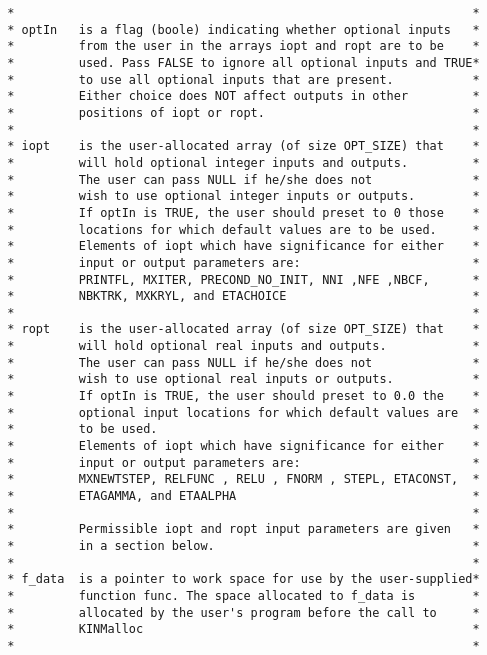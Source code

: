 \documentclass[11pt]{article}
\begin{document}
\begin{verbatim}
 *                                                                *
 * optIn   is a flag (boole) indicating whether optional inputs   *
 *         from the user in the arrays iopt and ropt are to be    *
 *         used. Pass FALSE to ignore all optional inputs and TRUE*
 *         to use all optional inputs that are present.           *
 *         Either choice does NOT affect outputs in other         *
 *         positions of iopt or ropt.                             *
 *                                                                *
 * iopt    is the user-allocated array (of size OPT_SIZE) that    *
 *         will hold optional integer inputs and outputs.         *
 *         The user can pass NULL if he/she does not              *
 *         wish to use optional integer inputs or outputs.        *
 *         If optIn is TRUE, the user should preset to 0 those    *
 *         locations for which default values are to be used.     *
 *         Elements of iopt which have significance for either    *
 *         input or output parameters are:                        *
 *         PRINTFL, MXITER, PRECOND_NO_INIT, NNI ,NFE ,NBCF,      *
 *         NBKTRK, MXKRYL, and ETACHOICE                          *
 *                                                                *
 * ropt    is the user-allocated array (of size OPT_SIZE) that    *
 *         will hold optional real inputs and outputs.            *
 *         The user can pass NULL if he/she does not              *
 *         wish to use optional real inputs or outputs.           *
 *         If optIn is TRUE, the user should preset to 0.0 the    *
 *         optional input locations for which default values are  *
 *         to be used.                                            *
 *         Elements of iopt which have significance for either    *
 *         input or output parameters are:                        *
 *         MXNEWTSTEP, RELFUNC , RELU , FNORM , STEPL, ETACONST,  *
 *         ETAGAMMA, and ETAALPHA                                 * 
 *                                                                *
 *         Permissible iopt and ropt input parameters are given   *
 *         in a section below.                                    *
 *                                                                *
 * f_data  is a pointer to work space for use by the user-supplied*
 *         function func. The space allocated to f_data is        *
 *         allocated by the user's program before the call to     *
 *         KINMalloc                                              *
 *                                                                *

\end{verbatim}
\end{document}
